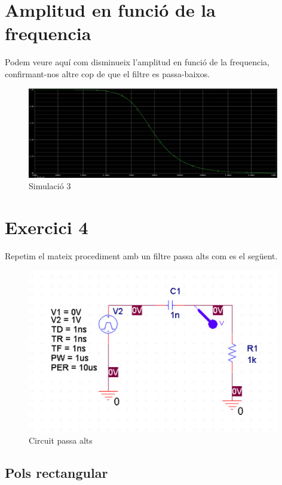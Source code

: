 \documentclass[12pt, a4papre]{article}
\begin{document}
	\section{Amplitud en funció de la frequencia}
	
	Podem veure aquí com disminueix l'amplitud en funció de la frequencia, confirmant-nos altre cop de que el filtre es passa-baixos.
	
	\begin{figure}[H]
		\begin{center}
		\includegraphics[width=110mm]{Pr0_3.jpeg}
		\caption{Simulació 3}
		\end{center}
	\end{figure}
	
	\section{Exercici 4}
	
	Repetim el mateix procediment amb un filtre passa alts com es el següent.

	\begin{figure}[H]
		\begin{center}
		\includegraphics[width=110mm]{Pr0_circ.jpeg}
		\caption{Circuit passa alts}
		\end{center}
	\end{figure}
	
	\subsection{Pols rectangular}
	
\end{document}
